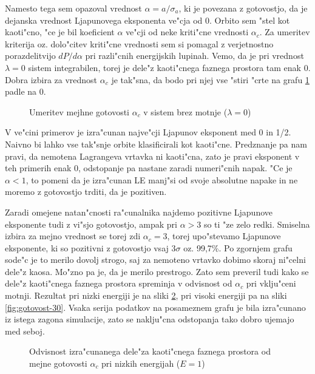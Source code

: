 \documentclass[a4paper,10pt]{article}
\begin{document}
Namesto tega sem opazoval vrednost $\alpha = a/\sigma_a$, ki je povezana z gotovostjo, da je dejanska vrednost Ljapunovega eksponenta ve"cja od 0. Orbito sem "stel kot kaoti"cno, "ce je bil koeficient $\alpha$ ve"cji od neke kriti"cne vrednosti $\alpha_c$. Za umeritev kriterija oz. dolo"citev kriti"cne vrednosti sem si pomagal z verjetnostno porazdelitvijo $dP/d\alpha$ pri razli"cnih energijskih lupinah. Vemo, da je pri vrednost $\lambda=0$ sistem integrabilen, torej je dele"z kaoti"cnega faznega prostora tam enak 0. Dobra izbira za vrednost $\alpha_c$ je tak"sna, da bodo pri njej vse "stiri "crte na grafu \ref{fig:umeritev} padle na 0. 

\begin{figure}[H]
 
 \caption{Umeritev mejhne gotovosti $\alpha_c$ v sistem brez motnje ($\lambda=0$)}
 \label{fig:umeritev}
\end{figure}

V ve"cini primerov je izra"cunan najve"cji Ljapunov eksponent med 0 in 1/2. Naivno bi lahko vse tak"snje orbite klasificirali kot kaoti"cne. Predznanje pa nam pravi, da nemotena Lagrangeva vrtavka ni kaoti"cna, zato je pravi eksponent v teh primerih enak 0, odstopanje pa nastane zaradi numeri"cnih napak. "Ce je $\alpha < 1$, to pomeni da je izra"cunan LE manj"si od svoje absolutne napake in ne moremo z gotovostjo trditi, da je pozitiven. 

Zaradi omejene natan"cnosti ra"cunalnika najdemo pozitivne Ljapunove eksponente tudi z vi"sjo gotovostjo, ampak pri $\alpha > 3$ so ti "ze zelo redki. Smiselna izbira za mejno vrednost se torej zdi $\alpha_c = 3$, torej upo"stevamo Ljapunove eksponente, ki so pozitivni z gotovostjo vsaj $3\sigma$ oz. 99,7\%. Po zgornjem grafu sode"c je to merilo dovolj strogo, saj za nemoteno vrtavko dobimo skoraj ni"celni dele"z kaosa. Mo"zno pa je, da je merilo prestrogo. Zato sem preveril tudi kako se dele"z kaoti"cnega faznega prostora spreminja v odvisnost od $\alpha_c$ pri vklju"ceni motnji. Rezultat pri nizki energiji je na sliki \ref{fig:gotovost-1}, pri visoki energiji pa na sliki \ref{fig:gotovost-30}. Vsaka serija podatkov na posameznem grafu je bila izra"cunano iz istega zagona simulacije, zato se naklju"cna odstopanja tako dobro ujemajo med seboj. 

\begin{figure}[H]
 
 \caption{Odvisnost izra"cunanega dele"za kaoti"cnega faznega prostora od mejne gotovosti $\alpha_c$ pri nizkih energijah ($E=1$)}
 \label{fig:gotovost-1}
\end{figure}
\end{document}
